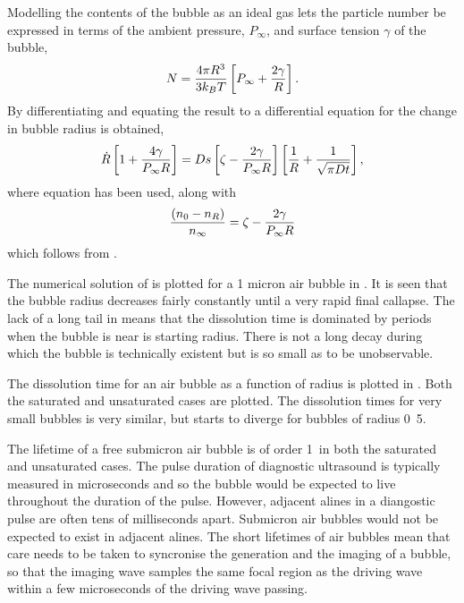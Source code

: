 Modelling the contents of the bubble as an ideal gas lets the particle number be expressed in terms of the ambient pressure, $P_\infty$, and surface tension $\gamma$ of the bubble,
\begin{align}
  N = \frac{4\pi R^3 }{3k_B T} \left[ P_\infty + \frac{2\gamma}{R} \right].
  \label{eqn:nuc:ParticleNumber}
\end{align}
By differentiating  and equating the result to  a differential equation for the change in bubble radius is obtained,
\begin{align}
   \dot{R}\left[  1+ \frac{4\gamma}{P_\infty R} \right] = Ds\left[  \zeta - \frac{2\gamma}{P_\infty R} \right]\left[ \frac{1}{R} + \frac{1}{\sqrt{\pi D t}} \right],
   \label{eqn:nuc:Rdot}
\end{align}
where equation  has been used, along with
\begin{align}
  \frac{\left( n_0 - n_R \right)}{n_\infty} = \zeta - \frac{2\gamma}{P_\infty R}
  \label{eqn:nuc:dissolve}
\end{align}
which follows from .






The numerical solution of  is plotted for a 1 micron air bubble in .
It is seen that the bubble radius decreases fairly constantly until a very rapid final callapse.
The lack of a long tail in 
means that the dissolution time is dominated by periods when the bubble is near is starting radius.
There is not a long decay during which the bubble is technically existent but is so small as to be unobservable.

The dissolution time for an air bubble as a function of radius is plotted in .
Both the saturated and unsaturated cases are plotted.
The dissolution times for very small bubbles is very similar,
but starts to diverge for bubbles of radius \unit{0.5}\micro\metre.

The lifetime of a free submicron air bubble is of order \unit{1}\milli\second\ in both the  saturated and unsaturated cases.
The pulse duration of diagnostic ultrasound is typically measured in microseconds and so the bubble would be expected to live throughout the duration of the pulse.
However, adjacent alines in a diangostic pulse are often tens of milliseconds apart.
Submicron air bubbles would not be expected to exist in adjacent alines.
The short lifetimes of air bubbles mean that care needs to be taken to syncronise the generation and the imaging of a bubble,
so that the imaging wave samples the same focal region as the driving wave within a few microseconds of the driving wave passing.


